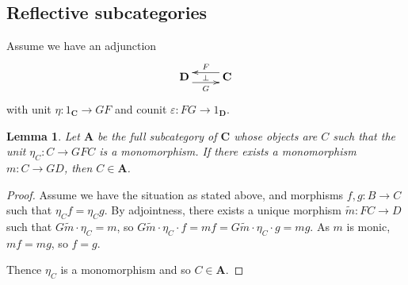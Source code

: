 \documentclass[11pt, a4paper, twoside,leqno]{amsart}
\def\blue{\leavevmode\color{blue}}%
\newcommand{\cat}[1]{\mathbf{#1}}
\newcommand{\cd}[2][]{\vcenter{\hbox{\xymatrix#1{#2}}}}
\numberwithin{equation}{section}
\theoremstyle{plain}
\newtheorem{Lemma}[Thm]{Lemma}
\theoremstyle{definition}
\newtheorem{Defn}[Thm]{Definition}
\renewcommand{\epsilon}{\varepsilon}
\begin{document}
%

\subsection{Reflective subcategories}
\label{sec:reflective-subcats}

Assume we have an adjunction
\begin{equation}
  \label{eq:adj-GF}
  \cd{
    {\cat{D}} \ar@<-4.5pt>[r]_-{G} \ar@{<-}@<4.5pt>[r]^-{F} \ar@{}[r]|-{\bot} &
    {\cat{C}}   
  }
\end{equation}
with unit \(\eta \colon 1_{\cat{C}} \rightarrow GF\) and counit
\(\epsilon \colon FG \rightarrow 1_{\cat{D}}\). 

\begin{Lemma}
  \label{lem:subcat-unit-mono-closure}
  Let \(\cat{A}\) be the full subcategory of \(\cat{C}\) whose
  objects are \(C\) such that the unit
  \(\eta_{C} \colon C \rightarrow GFC\)
  is a monomorphism. If there exists a monomorphism \(m \colon C
  \rightarrow GD\), then \(C \in \cat{A}\).
\end{Lemma}

\begin{proof}
  Assume we have the situation as stated above, and morphisms \(f,g
  \colon B \rightarrow C\) such that \(\eta_{C}f = \eta_{C}g\). By adjointness, there
  exists a unique morphism \(\tilde{m} \colon FC \rightarrow D\) such that
  \(G\tilde{m}\cdot\eta_{C} = m\), so \(G\tilde{m}\cdot\eta_{C} \cdot f = m
  f = G\tilde{m}\cdot\eta_{C} \cdot g = m g\). As \(m\) is monic, \(m f =
  m g\), so \(f = g\).

  Thence \(\eta_{C}\) is a monomorphism and so \(C \in \cat{A}\).
\end{proof}
\end{document}
